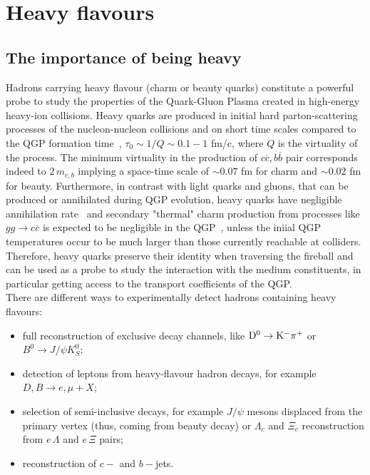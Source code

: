 \chapter{Heavy flavours} %
\label{Chapter2} %

\section{The importance of being heavy}
\label{sec:introChap2}
Hadrons carrying heavy flavour (charm or beauty quarks) 
constitute a powerful probe to study 
the properties of the Quark-Gluon Plasma created in high-energy 
heavy-ion collisions. Heavy quarks are produced in initial hard parton-scattering processes
of the nucleon-nucleon collisions and on short time scales compared 
to the QGP formation time~\cite{Liu:2012ax},
$\tau_0 \sim 1/Q \sim 0.1-1$ fm/c, where $Q$ is the virtuality of the process. 
The minimum virtuality in the production of $c\overline{c}, b\overline{b}$ pair 
corresponds indeed to $2\, m_{c,b}$
implying a space-time scale of $\sim 0.07$ fm for charm and 
$\sim 0.02$ fm for beauty. Furthermore, in contrast with light quarks and gluons, that can be produced or annihilated 
during QGP evolution, heavy quarks have negligible annihilation 
rate~\cite{BraunMunzinger:2007tn} and secondary "thermal" 
charm production from processes like $gg \rightarrow c\overline{c}$ is 
expected to be negligible in the QGP~\cite{Zhang:2007dm}, 
unless the iniial QGP temperatures occur to be much larger than 
those currently reachable at colliders. Therefore,
heavy quarks preserve their identity when traversing 
the fireball and can be used as a probe
to study the interaction with the medium
 constituents, in particular getting access to the 
transport coefficients of the QGP.\\
There are different ways to experimentally detect hadrons 
containing heavy flavours:
\begin{itemize}
\item full reconstruction of exclusive decay channels, 
like ${\rm D^0\to K^-\pi^+}$ or $B^0 \rightarrow J/\psi K^0_S$;
\item detection of leptons from heavy-flavour hadron decays, for example 
$D, B \rightarrow e, \mu + X$;
\item selection of semi-inclusive decays, 
for example $J/\psi$ mesons displaced 
from the primary vertex (thus, coming from beauty decay) or $\Lambda_c$ and
$\Xi_c$ reconstruction from $e\, \Lambda$ and $e\, \Xi$ pairs;
\item reconstruction of $c-$ and $b-$jets.
\end{itemize}
